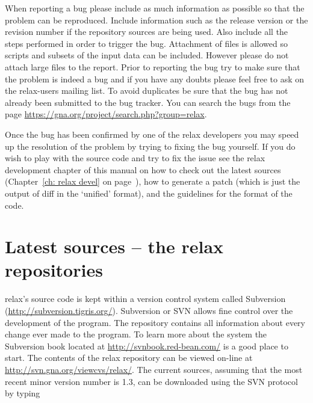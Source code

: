 When reporting a bug please include as much information as possible so that the problem can be reproduced.  Include information such as the release version or the revision number if the repository sources are being used.  Also include all the steps performed in order to trigger the bug.  Attachment of files is allowed so scripts and subsets of the input data can be included.  However please do not attach large files to the report.  Prior to reporting the bug try to make sure that the problem is indeed a bug and if you have any doubts please feel free to ask on the relax-users mailing list.  To avoid duplicates be sure that the bug has not already been submitted to the bug tracker.  You can search the bugs from the page \href{https://gna.org/project/search.php?group=relax}{https://gna.org/project/search.php?group=relax}.

Once the bug has been confirmed by one of the relax developers you may speed up the resolution of the problem by trying to fixing the bug yourself.  If you do wish to play with the source code and try to fix the issue see the relax development chapter of this manual on how to check out the latest sources (Chapter~\ref{ch: relax devel} on page~\pageref{ch: relax devel}), how to generate a patch (which is just the output of diff in the `unified' format), and the guidelines for the format of the code.




\section{Latest sources -- the relax repositories}

relax's source code is kept within a version control system called Subversion (\href{http://subversion.tigris.org/}{http://subversion.tigris.org/}).  Subversion or SVN allows fine control over the development of the program.  The repository contains all information about every change ever made to the program.  To learn more about the system the Subversion book located at \href{http://svnbook.red-bean.com/}{http://svnbook.red-bean.com/} is a good place to start.  The contents of the relax repository can be viewed on-line at \href{http://svn.gna.org/viewcvs/relax/}{http://svn.gna.org/viewcvs/relax/}.  The current sources, assuming that the most recent minor version number is 1.3, can be downloaded using the SVN protocol by typing

